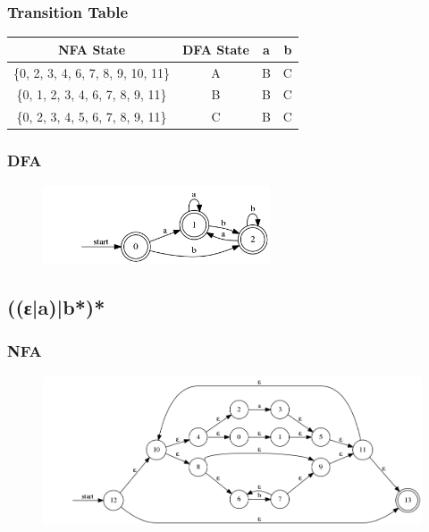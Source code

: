 \documentclass[paper=a4, fontsize=11pt]{scrartcl} %
\numberwithin{equation}{section} %
\numberwithin{figure}{section} %
\numberwithin{table}{section} %
\begin{document}
\subsubsection*{Transition Table}
\begin{table}[H]
\centering
\begin{tabular}{|c|c|c|c|}
\hline
NFA State & DFA State & a & b \\
\hline
\{0, 2, 3, 4, 6, 7, 8, 9, 10, 11\} & A & B & C \\
\hline
\{0, 1, 2, 3, 4, 6, 7, 8, 9, 11\} & B & B & C \\
\hline
\{0, 2, 3, 4, 5, 6, 7, 8, 9, 11\} & C & B & C \\
\hline
\end{tabular}
\end{table}
\subsubsection*{DFA}
\begin{figure}[H]
\centering
\includegraphics[width=0.6\textwidth]{3_2_2.png}
\label{fig:3_2_2}
\end{figure}

\subsection{((ε|a)|b*)*}
\subsubsection*{NFA}
\begin{figure}[H]
\centering
\includegraphics[width=1\textwidth]{3_3_1.png}
\label{fig:3_3_1}
\end{figure}
\end{document}
